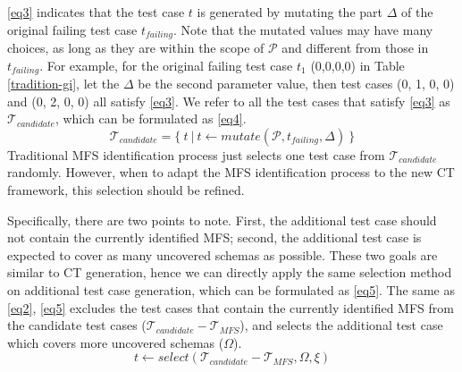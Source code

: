 \documentclass{sig-alternate}
\begin{document}
\ref{eq3} indicates that the test case $t$ is generated by mutating the part $\Delta$ of the original failing test case $t_{failing}$. Note that the mutated values may have many choices, as long as they are within the scope of $\mathcal{P}$ and different from those in $t_{failing}$. For example, for the original failing test case $t_{1}$ (0,0,0,0) in Table \ref{tradition-gi}, let the $\Delta$ be the second parameter value, then test cases (0, 1, 0, 0) and (0, 2, 0, 0) all satisfy \ref{eq3}. We refer to all the test cases that satisfy \ref{eq3} as $\mathcal{T}_{candidate}$, which can be formulated  as   \ref{eq4}.
\begin{displaymath}\mathcal{T}_{candidate} =  \{\ t\ |\ t \leftarrow  mutate (\mathcal{P}, t_{failing}, \Delta )\ \} \tag{EQ4} \label{eq4} \end{displaymath}
Traditional MFS identification process just selects one test case from $\mathcal{T}_{candidate}$ randomly. However, when to adapt the MFS identification process to the new CT framework, this selection should be refined.

Specifically, there are two points to note. First, the additional test case should not contain the currently identified MFS; second, the additional test case is expected to cover as many uncovered schemas as possible. These two goals are similar to CT generation, hence we can directly apply the same selection method on additional test case generation, which can be formulated as \ref{eq5}.  The same as \ref{eq2}, \ref{eq5} excludes the test cases that contain the currently identified MFS from the candidate test cases ($\mathcal{T}_{candidate} - \mathcal{T}_{MFS}$), and selects the additional test case which covers more uncovered schemas ($\Omega$).
\begin{displaymath}t \leftarrow  select (\mathcal{T}_{candidate} - \mathcal{T}_{MFS}, \Omega ,  \xi )  \tag{EQ5} \label{eq5} \end{displaymath}



\end{document}
